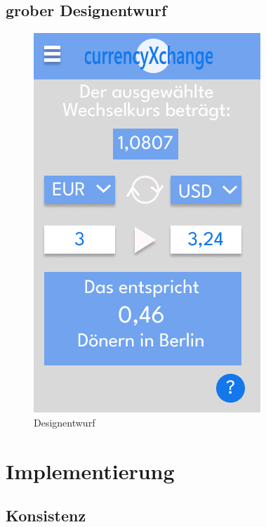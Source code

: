 \documentclass[conference]{IEEEtran}
\begin{document}
\subsection{grober Designentwurf}
\begin{figure}[h]
	\centering
	\includegraphics[width=0.5\linewidth, frame]{designentwurf}
	\caption[Designentwurf]{Designentwurf}
	\label{fig:designentwurf}
\end{figure}



\section{Implementierung}

\subsection{Konsistenz}
\end{document}
